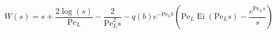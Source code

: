 $$
W(s) = s + \frac{2 \log{\left(s \right)}}{\mathrm{Pe}_L} - \frac{2}{\mathrm{Pe}_L^{2} s} - q(b) e^{- \mathrm{Pe}_L b} \left(\mathrm{Pe}_L \operatorname{Ei}{\left(\mathrm{Pe}_L s \right)} - \frac{e^{\mathrm{Pe}_L s}}{s}\right)
$$
